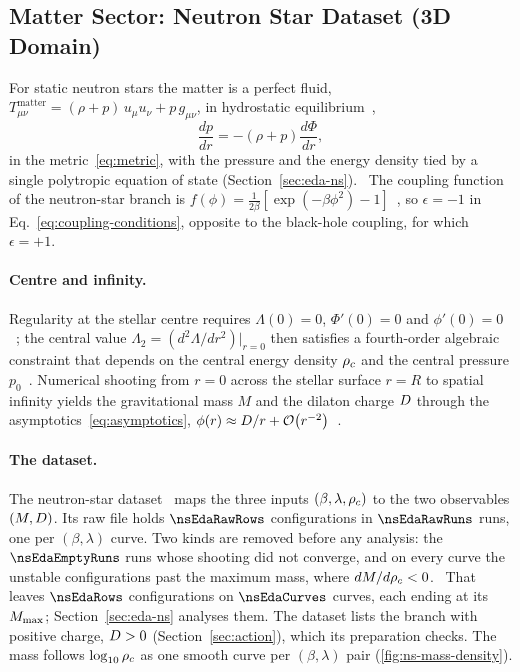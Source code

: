 \subsection{Matter Sector: Neutron Star Dataset (3D Domain)}
\label{sec:neutron-stars}

For static neutron stars the matter is a perfect fluid, $T^{\mathrm{matter}}_{\mu\nu} = (\rho + p)\, u_\mu u_\nu + p\, g_{\mu\nu}$, in hydrostatic equilibrium~\citep{Tolman1939,OppenheimerVolkoff1939},
\begin{equation}
  \frac{dp}{dr} = -(\rho + p) \frac{d\Phi}{dr},
  \label{eq:hydrostatic}
\end{equation}
in the metric~\eqref{eq:metric}, with the pressure and the energy density tied by a single polytropic equation of state (Section~\ref{sec:eda-ns}).~\citep{TODO_EquationOfState} The coupling function of the neutron-star branch is $f(\phi) = \frac{1}{2\beta} \left[ \exp(-\beta \phi^2) - 1 \right]$~\citep{Doneva2017_NS}, so $\epsilon = -1$ in Eq.~\eqref{eq:coupling-conditions}, opposite to the black-hole coupling, for which $\epsilon = +1$.

\paragraph{Centre and infinity.}
Regularity at the stellar centre requires $\Lambda(0) = 0$, $\Phi'(0) = 0$ and $\phi'(0) = 0$~\citep{Doneva2017_NS}; the central value $\Lambda_2 = (d^2\Lambda / dr^2)|_{r=0}$ then satisfies a fourth-order algebraic constraint that depends on the central energy density $\rho_c$ and the central pressure $p_0$~\citep{Doneva2017_NS}. Numerical shooting from $r = 0$ across the stellar surface $r = R$ to spatial infinity yields the gravitational mass $M$ and the dilaton charge $D$ through the asymptotics~\eqref{eq:asymptotics}, $\phi(r) \approx D / r + \mathcal{O}\!\left(r^{-2}\right)$~\citep{Doneva2017_NS}.

\paragraph{The dataset.}
The neutron-star dataset~\citep{Doneva2017_NS} maps the three inputs $(\beta, \lambda, \rho_c)$ to the two observables $(M, D)$. Its raw file holds $\nsEdaRawRows$ configurations in $\nsEdaRawRuns$ runs, one per $(\beta, \lambda)$ curve. Two kinds are removed before any analysis: the $\nsEdaEmptyRuns$ runs whose shooting did not converge, and on every curve the unstable configurations past the maximum mass, where $dM/d\rho_c < 0$.~\citep{TODO_MaxMassStability} That leaves $\nsEdaRows$ configurations on $\nsEdaCurves$ curves, each ending at its $M_{\max}$; Section~\ref{sec:eda-ns} analyses them. The dataset lists the branch with positive charge, $D > 0$ (Section~\ref{sec:action}), which its preparation checks. The mass follows $\log_{10}\rho_c$ as one smooth curve per $(\beta, \lambda)$ pair (\cref{fig:ns-mass-density}).


